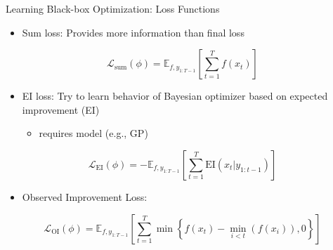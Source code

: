 \begin{frame}[c]{Learning Black-box Optimization: Loss Functions\newline {}}

\begin{itemize}
\item Sum loss: Provides more information than final loss
\end{itemize}
\begin{equation}
\mathcal{L}_{\text{sum}}(\phi) = \mathbb{E}_{f,y_{1:T-1}}\left[\sum_{t=1}^T f(x_t)\right]\nonumber
\end{equation}

\pause

\begin{itemize}
\item EI loss: Try to learn behavior of Bayesian optimizer based on expected improvement (EI)
\begin{itemize}
\item requires model (e.g., GP)
\end{itemize}
\end{itemize}
\begin{equation}
\mathcal{L}_{\text{EI}}(\phi) = - \mathbb{E}_{f,y_{1:T-1}}\left[\sum_{t=1}^T \text{EI}(x_t | y_{1:t-1})\right]\nonumber
\end{equation}

\pause

\begin{itemize}
\item Observed Improvement Loss:
\end{itemize}

\begin{equation}
\mathcal{L}_{\text{OI}}(\phi) = \mathbb{E}_{f,y_{1:T-1}}\left[\sum_{t=1}^T \min \left\{f(x_t) - \min_{i<t}(f(x_i)),0 \right\}  \right]\nonumber
\end{equation}

\end{frame}
